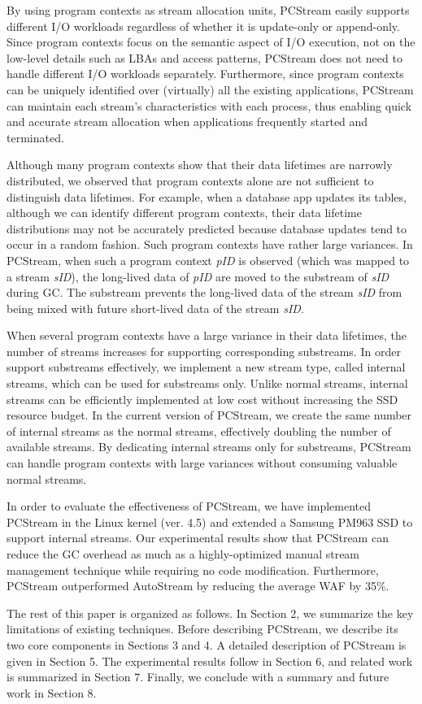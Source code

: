 By using program contexts as stream allocation units, \textsf{\small PCStream} easily 
supports different I/O workloads regardless of whether it is update-only or append-only.   
Since program contexts focus on the
semantic aspect of I/O execution, not on the low-level details such as 
LBAs and access patterns, \textsf{\small PCStream} does not need to handle different I/O workloads 
separately.  Furthermore,
since program contexts can be uniquely identified over (virtually) all the 
existing applications, PCStream can maintain each stream's characteristics 
with each process, thus enabling quick and
accurate stream allocation when applications frequently started and terminated.

Although many program contexts show that their data lifetimes are 
narrowly distributed, we observed 
that program contexts alone are not sufficient to distinguish data lifetimes.  
For example, when a database app updates its tables, although we can identify 
different program contexts, their data
lifetime distributions may not be accurately predicted because database 
updates tend to occur in a random fashion.  
Such program contexts have rather large variances.
In \textsf{\small PCStream}, 
when such a program context {\it pID} is observed (which was mapped to a stream {\it sID}), 
the long-lived data of {\it pID} are moved to the substream of {\it sID}
during GC.  
The substream prevents the long-lived data of the stream {\it sID} 
from being mixed with future short-lived data of the stream {\it sID}.

When several program contexts have a large variance in their data lifetimes, 
the number of streams increases for supporting corresponding substreams.
In order support substreams effectively, we implement a new stream type, 
called internal streams, which can be used for substreams only. 
Unlike normal streams, internal streams can be efficiently
implemented at low cost without increasing the SSD resource budget.  
In the current version of PCStream, we create the same number of internal streams 
as the normal streams, effectively doubling the number of available streams. 
By dedicating internal streams only for substreams, PCStream can handle 
program contexts with large variances without consuming valuable normal
streams.

In order to evaluate the effectiveness of \textsf{\small PCStream}, 
we have implemented \textsf{\small PCStream}
in the Linux kernel (ver. 4.5) and 
extended a Samsung PM963 SSD to support internal streams.
Our experimental results show that \textsf{\small PCStream}
can reduce the GC overhead as much as a highly-optimized 
manual stream management technique while requiring no code modification.  
Furthermore, \textsf{\small PCStream} outperformed \textsf{\small AutoStream} 
by reducing the average WAF by 35\%.

The rest of this paper is organized as follows. 
In Section 2, we summarize the key limitations of existing techniques.
Before describing PCStream, we describe its two core components in Sections 3 and 4.  
A detailed description of PCStream is given in Section 5. 
The experimental results follow in Section 6,
and related work is summarized in Section 7.  
Finally, we conclude with a summary and future work in Section 8.

